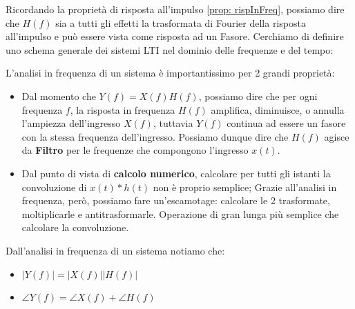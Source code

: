 Ricordando la proprietà di risposta all'impulso \eqref{prop: rispInFreq}, possiamo dire che $H(f)$ sia a tutti
gli effetti la trasformata di Fourier della risposta all'impulso e può essere vista come risposta ad un Fasore.
Cerchiamo di definire uno schema generale dei sistemi LTI nel dominio delle frequenze e del tempo:
\begin{center}
\end{center}

L'analisi in frequenza di un sistema è importantissimo per 2 grandi proprietà:
\begin{itemize}
    \item Dal momento che $Y(f) = X(f)H(f)$, possiamo dire che per ogni frequenza $f$, la risposta in frequenza $H(f)$
    amplifica, diminuisce, o annulla l'ampiezza dell'ingresso $X(f)$, tuttavia $Y(f)$ continua ad essere un fasore con la stessa frequenza dell'ingresso.
    Possiamo dunque dire che $H(f)$ agisce da \textbf{Filtro} per le frequenze che compongono l'ingresso $x(t)$.
    \item Dal punto di vista di \textbf{calcolo numerico}, calcolare per tutti gli istanti la convoluzione di $x(t) \ast h(t)$ non è proprio semplice;
    Grazie all'analisi in frequenza, però, possiamo fare un'escamotage: calcolare le 2 trasformate, moltiplicarle e antitrasformarle. Operazione di gran
    lunga più semplice che calcolare la convoluzione.
\end{itemize}
Dall'analisi in frequenza di un sistema notiamo che:
\begin{itemize}
    \item $|Y(f)| = |X(f)||H(f)|$
    \item $\angle Y(f) = \angle X(f) + \angle H(f)$
\end{itemize}